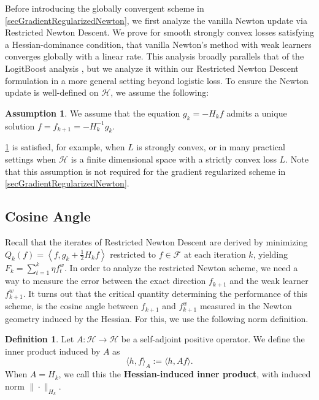 \documentclass{article}
\theoremstyle{plain}
\theoremstyle{definition}
\newtheorem{definition}[theorem]{Definition}
\newtheorem{assumption}[theorem]{Assumption}
\theoremstyle{remark}
\begin{document}
Before introducing the globally convergent scheme in \cref{secGradientRegularizedNewton}, we first analyze the vanilla Newton update via Restricted Newton Descent. We prove for smooth strongly convex losses satisfying a Hessian-dominance condition, that vanilla Newton's method with weak learners converges globally with a linear rate. This analysis broadly parallels that of the LogitBoost analysis \cite{2014AConvergenceRateAnalysisForLogitBoostMARTAndTheirVariant}, but we analyze it within our Restricted Newton Descent formulation in a more general setting beyond logistic loss. To ensure the Newton update is well-defined on $\mathcal{H}$, we assume the following:

\begin{assumption}\label{assumptionHessianNewtonEquationUniqueSolution}
    We assume that the equation $g_k = -H_k f$ admits a unique solution $f=f_{k+1} = - H_k^{-1} g_k$.
\end{assumption}

\cref{assumptionHessianNewtonEquationUniqueSolution} is satisfied, for example, when $L$ is strongly convex, or in many practical settings when $\mathcal{H}$ is a finite dimensional space with a strictly convex loss $L$. Note that this assumption is not required for the gradient regularized scheme in \cref{secGradientRegularizedNewton}.



\subsection{Cosine Angle}

Recall that the iterates of Restricted Newton Descent are derived by minimizing $Q_k(f) = \left\langle f, g_k + \frac{1}{2}H_k f \right\rangle$ restricted to $f\in\mathcal{F}$ at each iteration $k$, yielding $F_k = \sum_{t=1}^k \eta f^w_t$. In order to analyze the restricted Newton scheme, we need a way to measure the error between the exact direction $f_{k+1}$ and the weak learner $f^w_{k+1}$. It turns out that the critical quantity determining the performance of this scheme, is the cosine angle between $f_{k+1}$ and $f^w_{k+1}$ measured in the Newton geometry induced by the Hessian. For this, we use the following norm definition.




\begin{definition}\label{defCosineAngle}
    Let $A : \mathcal{H} \to \mathcal{H}$ be a self-adjoint positive operator. We define the inner product induced by $A$ as
    \begin{equation}
        \langle h, f\rangle_{A} := \langle h, A f\rangle.
    \end{equation}
    When $A = H_k$, we call this the \textbf{Hessian-induced inner product}, with induced norm $\|\cdot\|_{H_k}$.
\end{definition}
\end{document}
